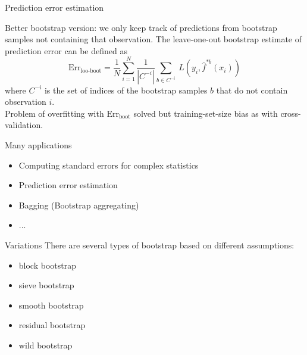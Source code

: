 \documentclass[14pt]{beamer}
\begin{document}
\begin{frame}[plain]{Prediction error estimation}

Better bootstrap version: we only keep track of predictions from bootstrap samples not containing that observation. The leave-one-out bootstrap estimate of prediction error can be defined as
\[ 
\text{Err}_{\text{loo-boot}} = \frac1N \sum_{i = 1}^N \frac{1}{|C^{-i}|}\sum_{b \in C^{-i}} \ L(y_i, \hat f^{*b}(x_i))
\]
where $C^{-i}$ is the set of indices of the bootstrap samples $b$ that do not contain observation $i$.\\

Problem of overfitting with $\text{Err}_{\text{boot}}$ solved but training-set-size bias as with cross-validation.

\end{frame}

\begin{frame}[plain]{Many applications}

\begin{itemize}
	\item Computing standard errors for complex statistics
	\item Prediction error estimation
	\item Bagging (Bootstrap aggregating)
	\item ...
\end{itemize}	
\pause

\begin{block}{Variations}
There are several types of bootstrap based on different assumptions:
\begin{itemize}\itemsep=0cm\parskip=0cm
\item block bootstrap
\item sieve bootstrap
\item smooth bootstrap
\item residual bootstrap
\item wild bootstrap
\end{itemize}
\end{block}
\end{frame}
\end{document}
